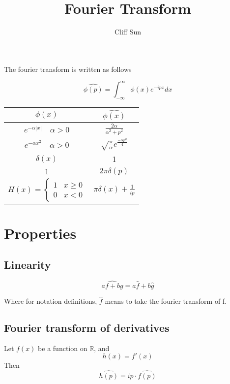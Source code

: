 \documentclass{article}
\title{Fourier Transform}
\author{Cliff Sun}
\newtheorem{one minute paper}[theorem]{One Minute Paper}
\begin{document}
\maketitle

The fourier transform is written as follows

\begin{equation}
    \hat{\phi(p)} = \int_{-\infty}^{\infty}\phi(x)e^{-ipx}dx
\end{equation}

\begin{center}
    \begin{tabular}{ c | c } 
        $\phi(x)$ & $\hat{\phi(x)}$ \\
        \hline
        $e^{-\alpha|x|} \quad \alpha > 0$ & $\frac{2\alpha}{\alpha^2 + p^2}$ \\
        \hline 
        $e^{-\alpha x^2} \quad \alpha > 0$ & $\sqrt{\frac{\pi}{\alpha}}e^{\frac{-\alpha p^2}{4}}$ \\
        \hline
        $\delta(x)$ & 1 \\
        \hline
        $1$ & $2\pi \delta(p)$ \\
        \hline 
        $H(x) = \begin{cases} 1 & x\geq 0 \\ 0 & x < 0 \end{cases}$ & $\pi \delta(x) + \frac{1}{ip}$
    \end{tabular}
\end{center}

\section*{Properties}

\subsection*{Linearity}

\begin{equation}
    \widehat{af + bg} = a\widehat{f} + b\widehat{g}
\end{equation}

Where for notation definitions, $\widehat{f}$ means to take the fourier transform of f. 

\subsection*{Fourier transform of derivatives}

Let $f(x)$ be a function on $\mathbb{R}$, and
\begin{equation}
    h(x) = f'(x)
\end{equation}
Then
\begin{equation}
    \widehat{h(p)} = ip \cdot \widehat{f(p)}
\end{equation}
\end{document}
